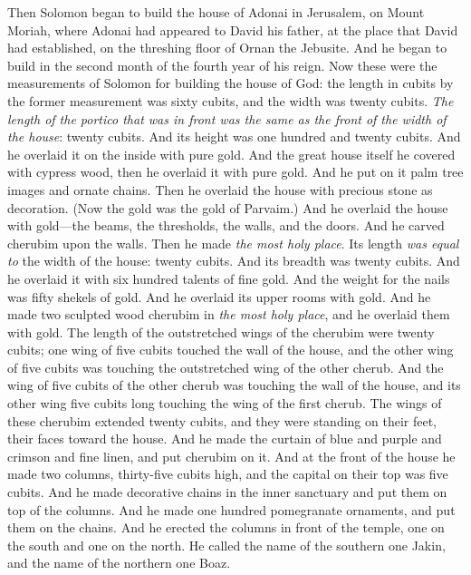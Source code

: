 \begin{biblechapter} %
 Then Solomon began to build the house of Adonai in Jerusalem, on Mount Moriah, where Adonai had appeared to David his father, at the place that David had established, on the threshing floor of Ornan the Jebusite.
\verse And he began to build in the second month of the fourth year of his reign.
\verse Now these were the measurements of Solomon for building the house of God: the length in cubits by the former measurement was sixty cubits, and the width was twenty cubits.
\verse \textit{The length of the portico that was in front was the same as the front of the width of the house}: twenty cubits. And its height was one hundred and twenty cubits. And he overlaid it on the inside with pure gold.
\verse And the great house itself he covered with cypress wood, then he overlaid it with pure gold. And he put on it palm tree images and ornate chains.
\verse Then he overlaid the house with precious stone as decoration. (Now the gold was the gold of Parvaim.)
\verse And he overlaid the house with gold—the beams, the thresholds, the walls, and the doors. And he carved cherubim upon the walls.
\verse Then he made \textit{the most holy place}. Its length \textit{was equal to} the width of the house: twenty cubits. And its breadth was twenty cubits. And he overlaid it with six hundred talents of fine gold.
\verse And the weight for the nails was fifty shekels of gold. And he overlaid its upper rooms with gold.
\verse And he made two sculpted wood cherubim in \textit{the most holy place}, and he overlaid them with gold.
\verse The length of the outstretched wings of the cherubim were twenty cubits; one wing of five cubits touched the wall of the house, and the other wing of five cubits was touching the outstretched wing of the other cherub.
\verse And the wing of five cubits of the other cherub was touching the wall of the house, and its other wing five cubits long touching the wing of the first cherub.
\verse The wings of these cherubim extended twenty cubits, and they were standing on their feet, their faces toward the house.
\verse And he made the curtain of blue and purple and crimson and fine linen, and put cherubim on it.
\verse And at the front of the house he made two columns, thirty-five cubits high, and the capital on their top was five cubits.
\verse And he made decorative chains in the inner sanctuary and put them on top of the columns. And he made one hundred pomegranate ornaments, and put them on the chains.
\verse And he erected the columns in front of the temple, one on the south and one on the north. He called the name of the southern one Jakin, and the name of the northern one Boaz.
\end{biblechapter}

